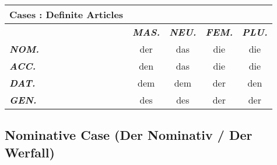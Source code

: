 \documentclass[a4paper,12pt]{article}
\begin{document}
\vspace{0.3cm}
\begin{tabular}{l|c c c c}

\toprule
\rowcolor{goethe_green}
\multicolumn{5}{c}
{\color{white} \textbf{Cases : Definite Articles} \color{black}} \\
\midrule



&
\cellcolor{lightgray} \textbf{\textit{MAS. }} &
\cellcolor{lightgray} \textbf{\textit{NEU.}}  &
\cellcolor{lightgray} \textbf{\textit{FEM.}}  &
\cellcolor{lightgray} \textbf{\textit{PLU.}} \\
\midrule

\cellcolor{lightgray} \textbf{\textit{NOM.}} &
\cellcolor{cell-lightpurple}  der                &
\cellcolor{cell-lightorange}  das               &
\cellcolor{cell-lightblue} die                &
\cellcolor{cell-lightblue} die \\

\cellcolor{lightgray} \textbf{\textit{ACC.}} &
\cellcolor{cell-lightgreen} den               &
\cellcolor{cell-lightorange}  das                &
\cellcolor{cell-lightblue}  die               &
\cellcolor{cell-lightblue} die \\

\cellcolor{lightgray} \textbf{\textit{DAT.}} &
\cellcolor{cell-lightred} dem               &
\cellcolor{cell-lightred} dem               &
\cellcolor{cell-lightpurple} der               &
\cellcolor{cell-lightgreen} den \\

\cellcolor{lightgray} \textbf{\textit{GEN.}} &
\cellcolor{cell-lightyellow} des               &
\cellcolor{cell-lightyellow} des               &
\cellcolor{cell-lightpurple} der               &
\cellcolor{cell-lightpurple} der \\







\bottomrule
\end{tabular}
\vspace{0.3cm}
\newline




\subsection{\bf{Nominative Case (Der Nominativ / Der Werfall)}}
\begin{adjustwidth}{2em}{0pt}
\label{sec:nominative_case_der_nominativ_der_werfall_}



\end{adjustwidth}
\end{document}
